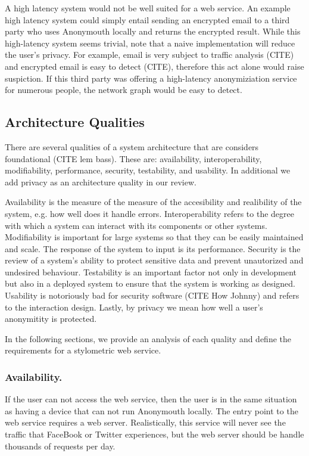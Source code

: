 \documentclass[letterpaper]{article}
\begin{document}
A high latency system would not be well
suited for a web service.  An example high latency system could simply
entail sending an encrypted email to a third party who uses Anonymouth
locally and returns the encrypted result.  While this high-latency
system seems trivial, note that a naive implementation will reduce the
user's privacy.  For example, email is very subject to traffic
analysis (CITE) and encrypted email is easy to detect (CITE),
therefore this act alone would raise suspiction.  If this third party
was offering a high-latency anonymiziation service for numerous
people, the network graph would be easy to detect.

\subsection{Architecture Qualities}
There are several qualities of a system architecture that are
considers foundational (CITE lem bass).  These are: availability,
interoperability, modifiability, performance, security, testability,
and usability.  In additional we add privacy as an architecture
quality in our review.

Availability is the measure of the measure of the accesibility and
realibility of the system, e.g. how well does it handle errors.
Interoperability refers to the degree with which a system can interact
with its components or other systems.  Modifiability is important for
large systems so that they can be easily maintained and scale.  The
response of the system to input is its performance.  Security is the
review of a system's ability to protect sensitive data and prevent
unautorized and undesired behaviour.  Testability is an important
factor not only in development but also in a deployed system to ensure
that the system is working as designed.  Usability is notoriously bad
for security software (CITE How Johnny) and refers to the interaction
design.  Lastly, by privacy we mean how well a user's anonymitity is
protected.

In the following sections, we provide an analysis of each quality and
define the requirements for a stylometric web service.


\subsubsection{Availability.}

If the user can not access the web service, then the user is in the
same situation as having a device that can not run Anonymouth
locally.  The entry point to the web service requires a web server.
Realistically, this service will never see the traffic that FaceBook
or Twitter experiences, but the web server should be handle thousands
of requests per day.
\end{document}
